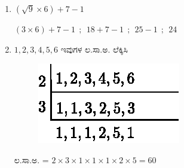 \begin{enumerate}
\begin{align*}
\therefore\quad \dfrac{x}{\cancel{9}_{3}} \times \cancel{21}^{7} & = x + 88\\
\dfrac{7x}{3} & = x + 88\\
7x & = 3x + 264\\
7x - 3x & = 264\\
4x & = 264\\
\therefore\quad x & = 66\quad\text{ ರೈಲಿನ ಉದ್ದ} ~~66 ~~\text{ ಮೀ}
\end{align*}

\item $(\sqrt{9}\times 6) + 7 - 1$

$(3\times 6) + 7 - 1 ~~;~~ 18 + 7 - 1 ~~;~~ 25 - 1 ~~;~~ 24$

\item $1, 2, 3, 4, 5, 6$ ಇವುಗಳ ಲ.ಸಾ.ಅ. ಲೆಕ್ಕಿಸಿ 

\begin{figure}[H]
\centering
\includegraphics{images/chap8/ans30.eps}

\end{figure}

ಲ.ಸಾ.ಅ.  = $2\times 3\times 1\times 1\times 1\times 2\times 5 = 60$
\end{enumerate}
